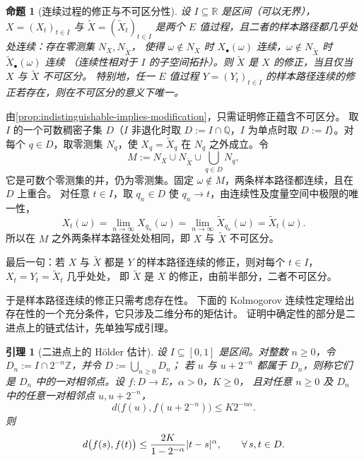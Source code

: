 \documentclass[UTF8,11pt,a4paper,oneside,fontset=fandol]{ctexrep}
\makeatletter
\numberwithin{equation}{section}
\theoremstyle{zhthm}
\newtheorem{proposition}[theorem]{命题}
\newtheorem{lemma}[theorem]{引理}
\renewenvironment{proof}[1][\proofname]{\par
  \pushQED{\qed}%
  \normalfont\topsep6\p@\@plus6\p@\relax
  \trivlist
  \item[\hskip\labelsep\bfseries#1\hspace{0.5em}]\ignorespaces
}{%
  \popQED\endtrivlist\@endpefalse
}
\renewcommand{\proofname}{证明}
\newcommand{\Z}{\mathbb{Z}}
\newcommand{\Q}{\mathbb{Q}}
\newcommand{\R}{\mathbb{R}}
\DeclarePairedDelimiter{\abs}{\lvert}{\rvert}
\makeatother
\begin{document}
\begin{proposition}[连续过程的修正与不可区分性]
\label{prop:continuous-modifications-indistinguishable}
设 $I\subseteq\R$ 是区间（可以无界），$X=(X_t)_{t\in I}$ 与 $\widetilde X=(\widetilde X_t)_{t\in I}$
是两个 $E$ 值过程，且二者的样本路径都几乎处处连续：存在零测集 $N_X,N_{\widetilde X}$，
使得 $\omega\notin N_X$ 时 $X_\bullet(\omega)$ 连续，$\omega\notin N_{\widetilde X}$ 时 $\widetilde X_\bullet(\omega)$ 连续
（连续性相对于 $I$ 的子空间拓扑）。则 $\widetilde X$ 是 $X$ 的修正，当且仅当 $X$ 与 $\widetilde X$ 不可区分。
特别地，任一 $E$ 值过程 $Y=(Y_t)_{t\in I}$ 的样本路径连续的修正若存在，则在不可区分的意义下唯一。
\end{proposition}

\begin{proof}
由\cref{prop:indistinguishable-implies-modification}，只需证明修正蕴含不可区分。
取 $I$ 的一个可数稠密子集 $D$（$I$ 非退化时取 $D:=I\cap\Q$，$I$ 为单点时取 $D:=I$）。对每个 $q\in D$，取零测集 $N_q$，使 $X_q=\widetilde X_q$ 在 $N_q$ 之外成立。令
\[
  M:=N_X\cup N_{\widetilde X}\cup\bigcup_{q\in D}N_q,
\]
它是可数个零测集的并，仍为零测集。固定 $\omega\notin M$，两条样本路径都连续，且在 $D$ 上重合。
对任意 $t\in I$，取 $q_n\in D$ 使 $q_n\to t$，由连续性及度量空间中极限的唯一性，
\[
  X_t(\omega)=\lim_{n\to\infty}X_{q_n}(\omega)=\lim_{n\to\infty}\widetilde X_{q_n}(\omega)=\widetilde X_t(\omega).
\]
所以在 $M$ 之外两条样本路径处处相同，即 $X$ 与 $\widetilde X$ 不可区分。

最后一句：若 $X$ 与 $\widetilde X$ 都是 $Y$ 的样本路径连续的修正，则对每个 $t\in I$，$X_t=Y_t=\widetilde X_t$ 几乎处处，
即 $\widetilde X$ 是 $X$ 的修正，由前半部分，二者不可区分。
\end{proof}

于是样本路径连续的修正只需考虑存在性。
下面的 Kolmogorov 连续性定理给出存在性的一个充分条件，它只涉及二维分布的矩估计。
证明中确定性的部分是二进点上的链式估计，先单独写成引理。

\begin{lemma}[二进点上的 Hölder 估计]
\label{lem:dyadic-holder}
设 $I\subseteq[0,1]$ 是区间。对整数 $n\ge0$，令 $D_n:=I\cap2^{-n}\Z$，并令 $D:=\bigcup_{n\ge0}D_n$；
若 $u$ 与 $u+2^{-n}$ 都属于 $D_n$，则称它们是 $D_n$ 中的一对相邻点。设 $f:D\to E$，$\alpha>0$，$K\ge0$，
且对任意 $n\ge0$ 及 $D_n$ 中的任意一对相邻点 $u,u+2^{-n}$，
\[
  d\bigl(f(u),f(u+2^{-n})\bigr)\le K2^{-n\alpha}.
\]
则
\[
  d\bigl(f(s),f(t)\bigr)\le\frac{2K}{1-2^{-\alpha}}\abs{t-s}^\alpha,\qquad\forall\,s,t\in D.
\]
\end{lemma}
\end{document}
